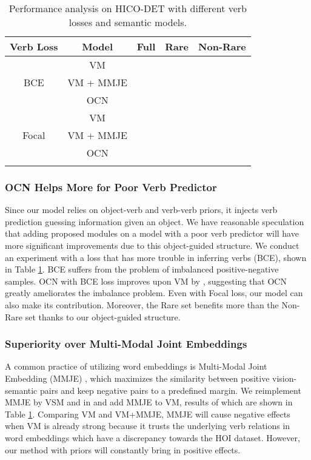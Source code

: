 \documentclass[letterpaper]{article} \usepackage{aaai22}  \usepackage{times}  \usepackage{helvet}  \usepackage{courier}  \usepackage[hyphens]{url}  \usepackage{graphicx} \urlstyle{rm} \def\UrlFont{\rm}  \usepackage{natbib}  \usepackage{caption} \DeclareCaptionStyle{ruled}{labelfont=normalfont,labelsep=colon,strut=off} \frenchspacing  \setlength{\pdfpagewidth}{8.5in}  \setlength{\pdfpageheight}{11in}  \usepackage{algorithm}
\begin{document}
\begin{table}[t]
  \small
  \setlength{\tabcolsep}{3pt}
  \centering
    \begin{tabular}{cc|ccc}
    \Xhline{1.0pt}
    {\scriptsize \textbf{Verb Loss}}  & \textbf{Model} & \textbf{Full}  & \textbf{Rare}  & {\footnotesize \textbf{Non-Rare}} \\
    \hline
    \hline
    \multirow{3}[2]{*}{BCE} & VM    &   &   &   \\
          & VM + MMJE &  &  &  \\
          & OCN  &  &  &  \\
    \hline
    \multirow{3}[2]{*}{Focal} & VM    &   &   &   \\
          & VM + MMJE &  &  &  \\
          & OCN  &  &  &  \\
    \Xhline{1.0pt}
    \end{tabular}\caption{Performance analysis on HICO-DET with different verb losses and semantic models.}
  \label{Balanced_Result_and_Joint_Embedding}\end{table}


\subsubsection{OCN Helps More for Poor Verb Predictor} Since our model relies on object-verb and verb-verb priors, it injects verb prediction guessing information given an object. We have reasonable speculation that adding proposed modules on a model with a poor verb predictor will have more significant improvements due to this object-guided structure. We conduct an experiment with a loss that has more trouble in inferring verbs (BCE), shown in Table \ref{Balanced_Result_and_Joint_Embedding}. BCE suffers from the problem of imbalanced positive-negative samples. OCN with BCE loss improves upon VM by , suggesting that OCN greatly ameliorates the imbalance problem. Even with Focal loss, our model can also make its contribution. Moreover, the Rare set benefits more than the Non-Rare set thanks to our object-guided structure.





\subsubsection{Superiority over Multi-Modal Joint Embeddings} A common practice of utilizing word embeddings is Multi-Modal Joint Embedding (MMJE) \cite{xu2019HOIwithknowledge}, which maximizes the similarity between positive vision-semantic pairs and keep negative pairs to a predefined margin. We reimplement MMJE by VSM and  in \cite{xu2019HOIwithknowledge} and add MMJE to VM, results of which are shown in Table \ref{Balanced_Result_and_Joint_Embedding}. Comparing VM and VM+MMJE, MMJE will cause negative effects when VM is already strong because it trusts the underlying verb relations in word embeddings which have a discrepancy towards the HOI dataset. However, our method with priors will constantly bring in positive effects.
\end{document}
